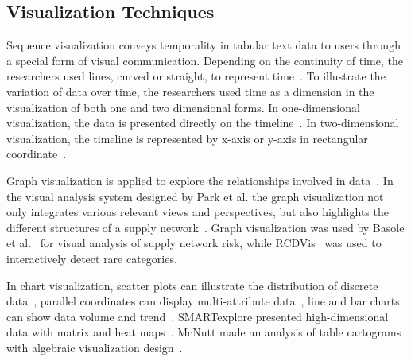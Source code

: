 \documentclass[a4paper,fleqn]{cas-dc}
\begin{document}
\subsection{Visualization Techniques}
Sequence visualization conveys temporality in tabular text data to users through a special form of visual communication. 
Depending on the continuity of time, the researchers used lines, curved or straight, to represent time~\cite{bach2015time}.
To illustrate the variation of data over time, the researchers used time as a dimension in the visualization of both one and two dimensional forms.
In one-dimensional visualization, the data is presented directly on the timeline~\cite{chen2017sequence,fulda2015timelinecurator,Gove}. In two-dimensional visualization, the timeline is represented by x-axis or y-axis in rectangular coordinate~\cite{Friedl2021,herr2018visual,sun2019planningvis}.

Graph visualization is applied to explore the relationships involved in data~\cite{Basole2014,Klammer2020,park2016visual,Qian2022,Sharif2014}.
In the visual analysis system designed by Park et al. the graph visualization not only integrates various relevant views and perspectives, but also highlights the different structures of a supply network~\cite{park2016visual}. Graph visualization was used by Basole et al.~\cite{Basole2014} for visual analysis of supply network risk, while RCDVis~\cite{Qian2022} was used to interactively detect rare categories.

In chart visualization, scatter plots can illustrate the distribution of discrete data~\cite{Mei2019,Fellow2017}, parallel coordinates can display multi-attribute data~\cite{Fellow2017,Tang2022}, line and bar charts can show data volume and trend~\cite{sun2019planningvis,Oppermann}. 
SMARTexplore presented high-dimensional data with matrix and heat maps~\cite{Blumenschein2018}. McNutt made an analysis of table cartograms with algebraic visualization design~\cite{McNutt2021}.
\end{document}

